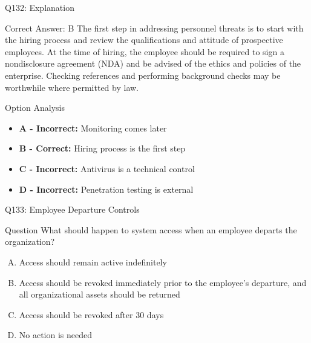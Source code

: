 \documentclass{beamer}
\begin{document}
	\begin{frame}{Q132: Explanation}
		\begin{block}{Correct Answer: B}
			The first step in addressing personnel threats is to start with the hiring process and review the qualifications and attitude of prospective employees. At the time of hiring, the employee should be required to sign a nondisclosure agreement (NDA) and be advised of the ethics and policies of the enterprise. Checking references and performing background checks may be worthwhile where permitted by law.
		\end{block}
		\begin{block}{Option Analysis}
			\begin{itemize}
				\item \textbf{A - Incorrect:} Monitoring comes later
				\item \textbf{B - Correct:} Hiring process is the first step
				\item \textbf{C - Incorrect:} Antivirus is a technical control
				\item \textbf{D - Incorrect:} Penetration testing is external
			\end{itemize}
		\end{block}
	\end{frame}
	
	\begin{frame}{Q133: Employee Departure Controls}
		\begin{block}{Question}
			What should happen to system access when an employee departs the organization?
		\end{block}
		\begin{enumerate}[(A)]
			\item Access should remain active indefinitely
			\item Access should be revoked immediately prior to the employee's departure, and all organizational assets should be returned
			\item Access should be revoked after 30 days
			\item No action is needed
		\end{enumerate}
	\end{frame}
	
\end{document}
